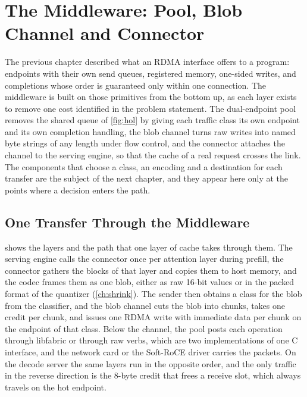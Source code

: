 \chapter{The Middleware: Pool, Blob Channel and Connector}
\label{ch:blobs}

The previous chapter described what an RDMA interface offers to a program:
endpoints with their own send queues, registered memory, one-sided writes,
and completions whose order is guaranteed only within one connection. The
middleware is built on those primitives from the bottom up, as
each layer exists to remove one cost identified in the problem statement. The
dual-endpoint pool removes the shared queue of \cref{fig:hol} by giving each
traffic class its own endpoint and its own completion handling, the blob
channel turns raw writes into named byte strings of any length under flow
control, and the connector attaches the channel to the serving engine, so
that the cache of a real request crosses the link. The components that choose
a class, an encoding and a destination for each transfer are the subject of
the next chapter, and they appear here only at the points where a decision
enters the path.

\section{One Transfer Through the Middleware}
\label{sec:overview}

 shows the layers and the path that one layer of cache
takes through them. The serving engine calls the connector once per attention
layer during prefill, the connector gathers the blocks of that layer and
copies them to host memory, and the codec frames them as one blob, either as
raw 16-bit values or in the packed format of the quantizer
(\cref{ch:shrink}). The sender then obtains a class for the blob from the
classifier, and the blob channel cuts the blob into chunks, takes one credit
per chunk, and issues one RDMA write with immediate data per chunk on the
endpoint of that class. Below the channel, the pool posts each operation
through libfabric or through raw verbs, which are two implementations of one
C interface, and the network card or the Soft-RoCE driver carries the
packets. On the decode server the same layers run in the opposite order, and
the only traffic in the reverse direction is the 8-byte credit that frees a
receive slot, which always travels on the hot endpoint.

